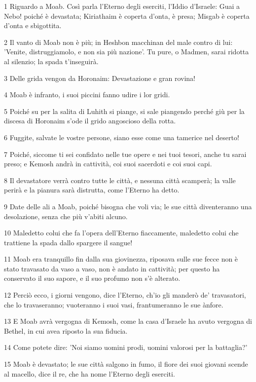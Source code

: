\par 1 Riguardo a Moab. Così parla l'Eterno degli eserciti, l'Iddio d'Israele: Guai a Nebo! poiché è devastata; Kiriathaim è coperta d'onta, è presa; Misgab è coperta d'onta e sbigottita.
\par 2 Il vanto di Moab non è più; in Heshbon macchinan del male contro di lui: 'Venite, distruggiamolo, e non sia più nazione'. Tu pure, o Madmen, sarai ridotta al silenzio; la spada t'inseguirà.
\par 3 Delle grida vengon da Horonaim: Devastazione e gran rovina!
\par 4 Moab è infranto, i suoi piccini fanno udire i lor gridi.
\par 5 Poiché su per la salita di Luhith si piange, si sale piangendo perché giù per la discesa di Horonaim s'ode il grido angoscioso della rotta.
\par 6 Fuggite, salvate le vostre persone, siano esse come una tamerice nel deserto!
\par 7 Poiché, siccome ti sei confidato nelle tue opere e nei tuoi tesori, anche tu sarai preso; e Kemosh andrà in cattività, coi suoi sacerdoti e coi suoi capi.
\par 8 Il devastatore verrà contro tutte le città, e nessuna città scamperà; la valle perirà e la pianura sarà distrutta, come l'Eterno ha detto.
\par 9 Date delle ali a Moab, poiché bisogna che voli via; le sue città diventeranno una desolazione, senza che più v'abiti alcuno.
\par 10 Maledetto colui che fa l'opera dell'Eterno fiaccamente, maledetto colui che trattiene la spada dallo spargere il sangue!
\par 11 Moab era tranquillo fin dalla sua giovinezza, riposava sulle sue fecce non è stato travasato da vaso a vaso, non è andato in cattività; per questo ha conservato il suo sapore, e il suo profumo non s'è alterato.
\par 12 Perciò ecco, i giorni vengono, dice l'Eterno, ch'io gli manderò de' travasatori, che lo travaseranno; vuoteranno i suoi vasi, frantumeranno le sue ànfore.
\par 13 E Moab avrà vergogna di Kemosh, come la casa d'Israele ha avuto vergogna di Bethel, in cui avea riposto la sua fiducia.
\par 14 Come potete dire: 'Noi siamo uomini prodi, uomini valorosi per la battaglia?'
\par 15 Moab è devastato; le sue città salgono in fumo, il fiore dei suoi giovani scende al macello, dice il re, che ha nome l'Eterno degli eserciti.
